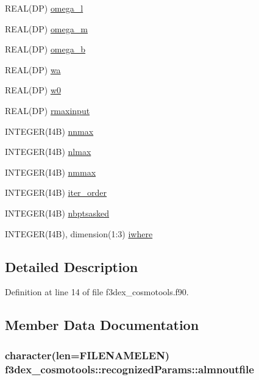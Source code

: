 \begin{DoxyCompactItemize}
\item 
REAL(DP) \hyperlink{typef3dex__cosmotools_1_1recognized_params_a8f92a79b3b1828d146cc09b9dd88d0ae}{omega\_\-l}
\item 
REAL(DP) \hyperlink{typef3dex__cosmotools_1_1recognized_params_a9694f2e73db534d756551e0574fec699}{omega\_\-m}
\item 
REAL(DP) \hyperlink{typef3dex__cosmotools_1_1recognized_params_a980f98fea94e5d7b6fee2996744dcdf0}{omega\_\-b}
\item 
REAL(DP) \hyperlink{typef3dex__cosmotools_1_1recognized_params_a3e31572d077d164d5b2b6c62a772a6ba}{wa}
\item 
REAL(DP) \hyperlink{typef3dex__cosmotools_1_1recognized_params_acd2fc10976a6a78c250ab29f9a2fa547}{w0}
\item 
REAL(DP) \hyperlink{typef3dex__cosmotools_1_1recognized_params_a294186863347b6b31dba6e5d547967cb}{rmaxinput}
\item 
INTEGER(I4B) \hyperlink{typef3dex__cosmotools_1_1recognized_params_ab7d187abd89f3a1ef4be507a966803ae}{nnmax}
\item 
INTEGER(I4B) \hyperlink{typef3dex__cosmotools_1_1recognized_params_ad9f08af96ee6a8be399f0e8d2426fabe}{nlmax}
\item 
INTEGER(I4B) \hyperlink{typef3dex__cosmotools_1_1recognized_params_afc2f40d1065ec8e432d4fe57f5ec1d8d}{nmmax}
\item 
INTEGER(I4B) \hyperlink{typef3dex__cosmotools_1_1recognized_params_aa852a64a0af873408ec5f28b8c542c93}{iter\_\-order}
\item 
INTEGER(I4B) \hyperlink{typef3dex__cosmotools_1_1recognized_params_af5d0daf3a9aa22ce25fd3cf50ce976dd}{nbptsasked}
\item 
INTEGER(I4B), dimension(1:3) \hyperlink{typef3dex__cosmotools_1_1recognized_params_a3d160c10b254a3978520c26f72be8bf2}{iwhere}
\end{DoxyCompactItemize}


\subsection{Detailed Description}


Definition at line 14 of file f3dex\_\-cosmotools.f90.



\subsection{Member Data Documentation}
\hypertarget{typef3dex__cosmotools_1_1recognized_params_a1bb219157b5d884dee879611d2681799}{
\subsubsection[{almnoutfile}]{\setlength{\rightskip}{0pt plus 5cm}character(len=FILENAMELEN) {\bf f3dex\_\-cosmotools::recognizedParams::almnoutfile}}}
\label{typef3dex__cosmotools_1_1recognized_params_a1bb219157b5d884dee879611d2681799}


